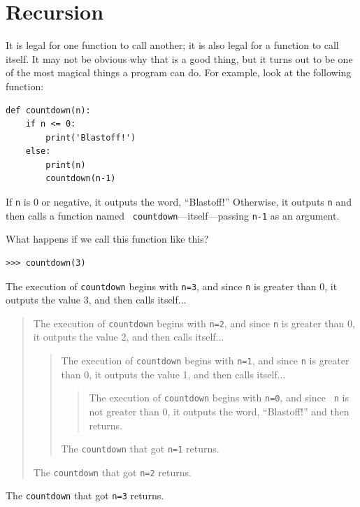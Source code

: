 \documentclass[10pt]{book}
\begin{document}
\section{Recursion}
\label{recursion}

It is legal for one function to call another;
it is also legal for a function to call itself.  It may not be obvious
why that is a good thing, but it turns out to be one of the most
magical things a program can do.
For example, look at the following function:

\beforeverb
\begin{verbatim}
def countdown(n):
    if n <= 0:
        print('Blastoff!')
    else:
        print(n)
        countdown(n-1)
\end{verbatim}
\afterverb
%
If {\tt n} is 0 or negative, it outputs the word, ``Blastoff!''
Otherwise, it outputs {\tt n} and then calls a function named {\tt
countdown}---itself---passing {\tt n-1} as an argument.

What happens if we call this function like this?

\beforeverb
\begin{verbatim}
>>> countdown(3)
\end{verbatim}
\afterverb
%
The execution of {\tt countdown} begins with {\tt n=3}, and since
{\tt n} is greater than 0, it outputs the value 3, and then calls itself...

\begin{quote}
The execution of {\tt countdown} begins with {\tt n=2}, and since
{\tt n} is greater than 0, it outputs the value 2, and then calls itself...

\begin{quote}
The execution of {\tt countdown} begins with {\tt n=1}, and since
{\tt n} is greater than 0, it outputs the value 1, and then calls itself...

\begin{quote}
The execution of {\tt countdown} begins with {\tt n=0}, and since {\tt
n} is not greater than 0, it outputs the word, ``Blastoff!'' and then
returns.
\end{quote}

The {\tt countdown} that got {\tt n=1} returns.
\end{quote}

The {\tt countdown} that got {\tt n=2} returns.
\end{quote}

The {\tt countdown} that got {\tt n=3} returns.
\end{document}

